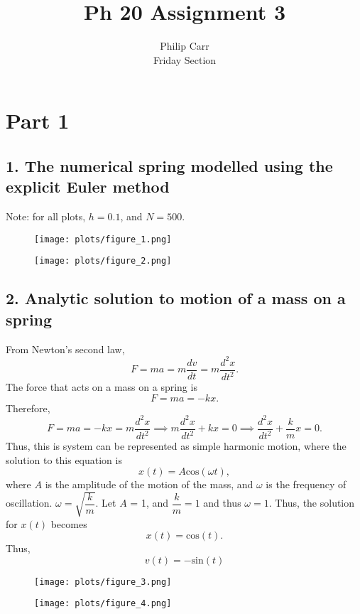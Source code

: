 \documentclass{article}
\title{Ph 20 Assignment 3}
\author{Philip Carr\\Friday Section}
\date{}
\begin{document}
\maketitle

\section*{Part 1}
\subsection*{1. The numerical spring modelled using the explicit Euler method}
Note: for all plots, $h = 0.1$, and $N = 500$.

\begin{figure}[H]
\centering
\texttt{[image: plots/figure\_1.png]}
\end{figure}

\begin{figure}[H]
\centering
\texttt{[image: plots/figure\_2.png]}
\end{figure}

\subsection*{2. Analytic solution to motion of a mass on a spring}
From Newton's second law,
\[ F = ma = m\dfrac{dv}{dt} = m\dfrac{d^2 x}{dt^2}. \]
The force that acts on a mass on a spring is
\[ F = ma = -kx. \]
Therefore,
\[ F = ma = -kx = m\dfrac{d^2 x}{dt^2} \implies m\dfrac{d^2 x}{dt^2} + kx = 0 \implies \dfrac{d^2 x}{dt^2} + \dfrac{k}{m}x = 0. \]
Thus, this is system can be represented as simple harmonic motion, where the solution to this equation is
\[ x(t) = A\text{cos}(\omega t), \]
where $A$ is the amplitude of the motion of the mass, and $\omega$ is the frequency of oscillation. $\omega = \sqrt{\dfrac{k}{m}}$. Let $A$ = 1, and $\dfrac{k}{m} = 1$ and thus $\omega = 1$. Thus, the solution for $x(t)$ becomes
\[ x(t) = \text{cos}(t). \]
Thus,
\[ v(t) = -\text{sin}(t) \]

\begin{figure}[H]
\centering
\texttt{[image: plots/figure\_3.png]}
\end{figure}

\begin{figure}[H]
\centering
\texttt{[image: plots/figure\_4.png]}
\end{figure}
\end{document}
